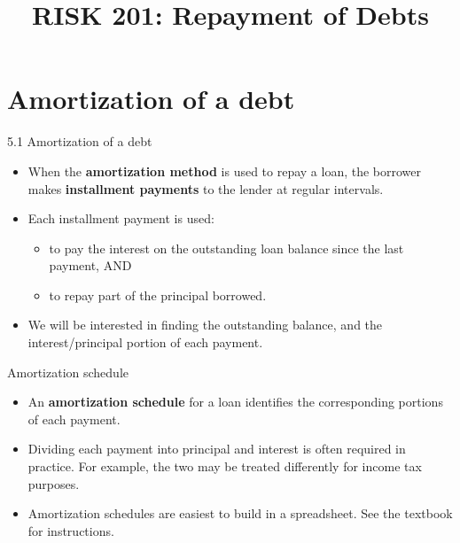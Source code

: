 \documentclass{beamer}
\title{RISK 201: Repayment of Debts}
\begin{document}
\maketitle

\section{Amortization of a debt}

\begin{frame}{5.1 Amortization of a debt}

\begin{itemize}
\item When the \textbf{amortization method} is used to repay a loan, the borrower makes \textbf{installment payments} to the lender at regular intervals.
\medskip
\item Each installment payment is used:
  \begin{itemize}
  \item to pay the interest on the outstanding loan balance since the last payment, AND
  \item to repay part of the principal borrowed.
  \end{itemize}
\medskip
\item We will be interested in finding the outstanding balance, and the interest/principal portion of each payment.
\end{itemize}

\end{frame}

\begin{frame}{Amortization schedule}

\begin{itemize}
\item An \textbf{amortization schedule} for a loan identifies the corresponding portions of each payment.
\medskip
\item Dividing each payment into principal and interest is often required in practice. For example, the two may be treated differently for income tax purposes.
\medskip
\item Amortization schedules are easiest to build in a spreadsheet. See the textbook for instructions.
\end{itemize}

\end{frame}
\end{document}
